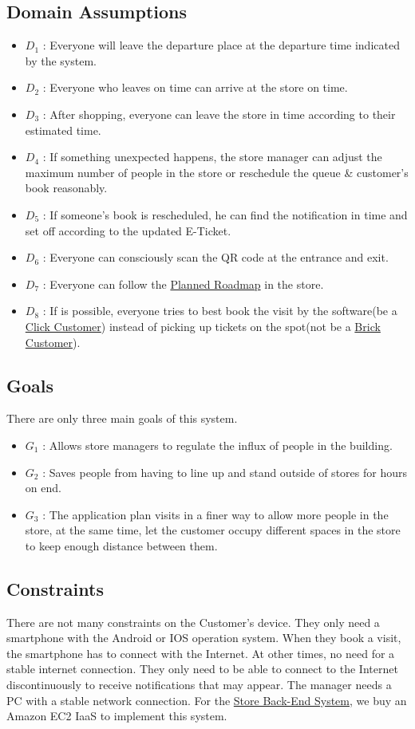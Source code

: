 \documentclass[a4paper,12pt]{report}
\begin{document}
\subsection{Domain Assumptions}
\begin{itemize}
	\item $D_1$ : Everyone will leave the departure place at the departure time indicated by the system.
	\item $D_2$ : Everyone who leaves on time can arrive at the store on time.
	\item $D_3$ : After shopping, everyone can leave the store in time according to their estimated time.
	\item $D_4$ : If something unexpected happens, the store manager can adjust the maximum number of people in the store or reschedule the queue \& customer's book reasonably.
	\item $D_5$ : If someone’s book is rescheduled, he can find the notification in time and set off according to the updated E-Ticket.
	\item $D_6$ : Everyone can consciously scan the QR code at the entrance and exit.
	\item $D_7$ : Everyone can follow the \hyperref[Definitions]{Planned Roadmap} in the store.
	\item $D_8$ : If is possible, everyone tries to best book the visit by the software(be a \hyperref[Definitions]{Click Customer}) instead of picking up tickets on the spot(not be a \hyperref[Definitions]{Brick Customer}).
\end{itemize}

\subsection{Goals}
There are only three main goals of this system.
\begin{itemize}
	\item $G_1$ : Allows store managers to regulate the influx of people in the building.
	\item $G_2$ : Saves people from having to line up and stand outside of stores for hours on end.
	\item $G_3$ : The application plan visits in a finer way to allow more people in the store, at the same time, let the customer occupy different spaces in the store to keep enough distance between them.
\end{itemize}

\subsection{Constraints}
There are not many constraints on the Customer's device. They only need a smartphone with the Android or IOS operation system. When they book a visit, the smartphone has to connect with the Internet. At other times, no need for a stable internet connection. They only need to be able to connect to the Internet discontinuously to receive notifications that may appear.
The manager needs a PC with a stable network connection.
For the \hyperref[Definitions]{Store Back-End System}, we buy an Amazon EC2 IaaS to implement this system.
\end{document}

